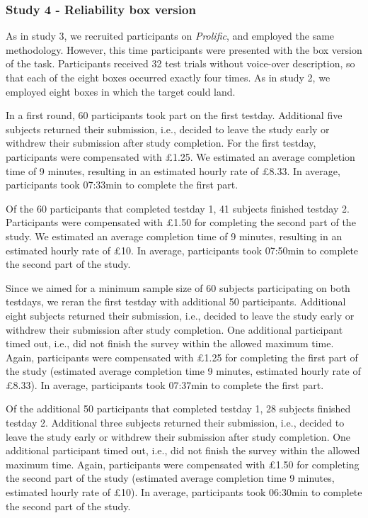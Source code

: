 \documentclass[
  man,floatsintext]{apa6}
\begin{document}
\hypertarget{study-4---reliability-box-version}{%
\subsubsection{Study 4 - Reliability box version}\label{study-4---reliability-box-version}}

As in study 3, we recruited participants on \emph{Prolific}, and employed the same methodology. However, this time participants were presented with the box version of the task. Participants received 32 test trials without voice-over description, so that each of the eight boxes occurred exactly four times. As in study 2, we employed eight boxes in which the target could land.

In a first round, 60 participants took part on the first testday. Additional five subjects returned their submission, i.e., decided to leave the study early or withdrew their submission after study completion. For the first testday, participants were compensated with £1.25. We estimated an average completion time of 9 minutes, resulting in an estimated hourly rate of £8.33. In average, participants took 07:33min to complete the first part.

Of the 60 participants that completed testday 1, 41 subjects finished testday 2. Participants were compensated with £1.50 for completing the second part of the study. We estimated an average completion time of 9 minutes, resulting in an estimated hourly rate of £10. In average, participants took 07:50min to complete the second part of the study.

Since we aimed for a minimum sample size of 60 subjects participating on both testdays, we reran the first testday with additional 50 participants. Additional eight subjects returned their submission, i.e., decided to leave the study early or withdrew their submission after study completion. One additional participant timed out, i.e., did not finish the survey within the allowed maximum time. Again, participants were compensated with £1.25 for completing the first part of the study (estimated average completion time 9 minutes, estimated hourly rate of £8.33). In average, participants took 07:37min to complete the first part.

Of the additional 50 participants that completed testday 1, 28 subjects finished testday 2. Additional three subjects returned their submission, i.e., decided to leave the study early or withdrew their submission after study completion. One additional participant timed out, i.e., did not finish the survey within the allowed maximum time. Again, participants were compensated with £1.50 for completing the second part of the study (estimated average completion time 9 minutes, estimated hourly rate of £10). In average, participants took 06:30min to complete the second part of the study.
\end{document}
